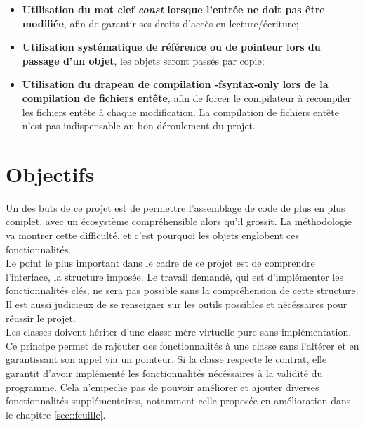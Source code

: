 \documentclass[9pts]{article}
\begin{document}
\begin{itemize}
\item \textbf{Utilisation du mot clef \emph{const} lorsque l'entrée ne doit pas être modifiée}, afin de garantir ses droits d'accès en lecture/écriture;
\item \textbf{Utilisation systématique de référence ou de pointeur lors du passage d'un objet}, les objets seront passés par copie;
\item \textbf{Utilisation du drapeau de compilation -fsyntax-only lors de la compilation de fichiers entête}, afin de forcer le compilateur à recompiler les fichiers entête à chaque modification. La compilation de fichiers entête n'est pas indispensable au bon déroulement du projet.
\end{itemize}

\pagebreak

\section{Objectifs}

Un des buts de ce projet est de permettre l'assemblage de code de plus en plus complet, avec un écosystème compréhensible alors qu'il grossit. La méthodologie va montrer cette difficulté, et
c'est pourquoi les objets englobent ces fonctionnalités. \\

Le point le plus important dans le cadre de ce projet est de comprendre l'interface, la structure imposée. Le travail demandé, qui est d'implémenter les fonctionnalités clés, ne sera pas possible sans la compréhension de cette structure. Il est aussi judicieux de se renseigner sur les outils possibles et nécéssaires pour réussir le projet.\\

Les classes doivent hériter d'une classe mère virtuelle pure sans implémentation. Ce principe permet de rajouter des fonctionnalités à une classe sans l'altérer et en garantissant son appel via un pointeur.
Si la classe respecte le contrat, elle garantit d'avoir implémenté les fonctionnalités nécéssaires à la validité du programme. Cela n'empeche pas de pouvoir améliorer et ajouter diverses fonctionnalités supplémentaires, notamment celle proposée en amélioration dans le chapitre \ref{sec::feuille}. \\
\end{document}
